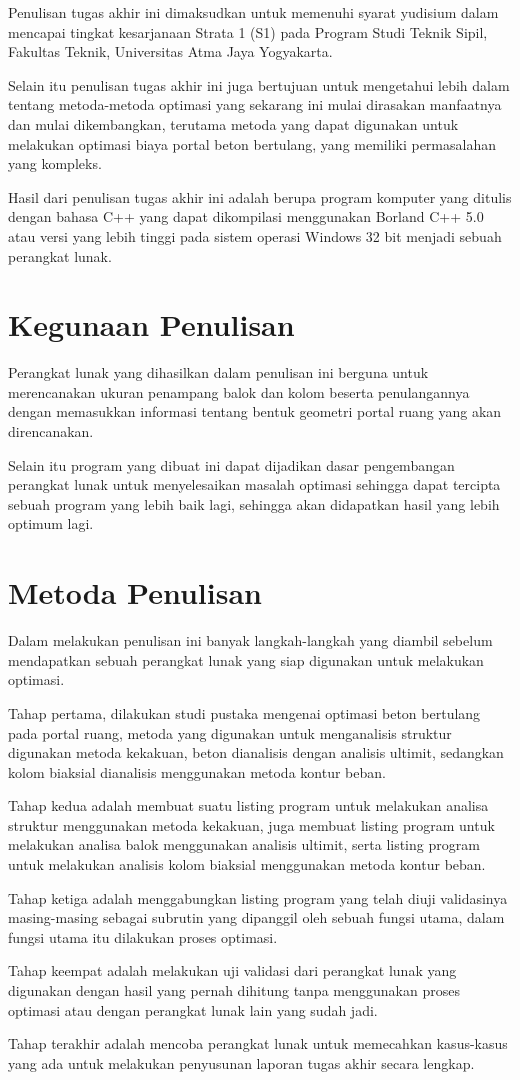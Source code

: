 Penulisan tugas akhir ini dimaksudkan untuk memenuhi syarat yudisium dalam
mencapai tingkat kesarjanaan Strata 1 (S1) pada Program Studi Teknik Sipil,
Fakultas Teknik, Universitas Atma Jaya Yogyakarta.

Selain itu penulisan tugas akhir ini juga bertujuan untuk mengetahui lebih
dalam tentang metoda-metoda optimasi yang sekarang ini mulai dirasakan
manfaatnya dan mulai dikembangkan, terutama metoda yang dapat digunakan
untuk melakukan optimasi biaya portal beton bertulang, yang memiliki
permasalahan yang kompleks.

Hasil dari penulisan tugas akhir ini adalah berupa program komputer yang
ditulis dengan bahasa C++ yang dapat dikompilasi menggunakan Borland C++
5.0 atau versi yang lebih tinggi pada sistem operasi Windows 32 bit menjadi
sebuah perangkat lunak.

\section{Kegunaan Penulisan}

Perangkat lunak yang dihasilkan dalam penulisan ini berguna untuk
merencanakan ukuran penampang balok dan kolom beserta penulangannya dengan
memasukkan informasi tentang bentuk geometri portal ruang yang akan
direncanakan.

Selain itu program yang dibuat ini dapat dijadikan dasar pengembangan
perangkat lunak untuk menyelesaikan masalah optimasi sehingga dapat
tercipta sebuah program yang lebih baik lagi, sehingga akan didapatkan
hasil yang lebih optimum lagi.

\section{Metoda Penulisan}

Dalam melakukan penulisan ini banyak langkah-langkah yang diambil sebelum
mendapatkan sebuah perangkat lunak yang siap digunakan untuk melakukan
optimasi.

Tahap pertama, dilakukan studi pustaka mengenai optimasi beton bertulang
pada portal ruang, metoda yang digunakan untuk menganalisis struktur
digunakan metoda kekakuan, beton dianalisis dengan analisis ultimit,
sedangkan kolom biaksial dianalisis menggunakan metoda kontur beban.

Tahap kedua adalah membuat suatu listing program untuk melakukan analisa
struktur menggunakan metoda kekakuan, juga membuat listing program untuk
melakukan analisa balok menggunakan analisis ultimit, serta listing program
untuk melakukan analisis kolom biaksial menggunakan metoda kontur beban.

Tahap ketiga adalah menggabungkan listing program yang telah diuji
validasinya masing-masing sebagai subrutin yang dipanggil oleh sebuah
fungsi utama, dalam fungsi utama itu dilakukan proses optimasi.

Tahap keempat adalah melakukan uji validasi dari perangkat lunak yang
digunakan dengan hasil yang pernah dihitung tanpa menggunakan proses
optimasi atau dengan perangkat lunak lain yang sudah jadi.

Tahap terakhir adalah mencoba perangkat lunak untuk memecahkan kasus-kasus
yang ada untuk melakukan penyusunan laporan tugas akhir secara lengkap.
